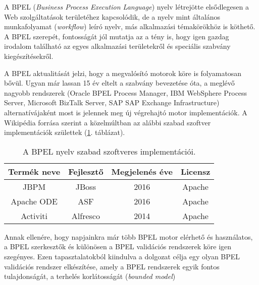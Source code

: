

A BPEL (\textit{Business Process Execution Language}) nyelv létrejötte elsődlegesen a Web szolgáltatások területéhez kapcsolódik, de a nyelv mint általános munkafolyamat (\textit{workflow}) leíró nyelv, más alkalmazási témakörökhöz is köthető. A BPEL szerepét, fontosságát jól mutatja az a tény is, hogy igen gazdag irodalom található az egyes alkalmazási területekről és speciális szabvány kiegészítésekről.

A  BPEL aktualitását jelzi, hogy a megvalósító motorok köre is folyamatosan bővül. Ugyan már lassan 15 év eltelt a szabvány bevezetése óta, a meglévő nagyobb rendszerek (Oracle BPEL Process Manager, IBM WebSphere Process Server, Microsoft BizTalk Server, SAP SAP Exchange Infrastructure) alternatívájaként  most is jelennek meg új végrehajtó motor implementációk. A Wikipédia forrása szerint \cite{wikiBpelList} a közelmúltban az alábbi szabad szoftver implementációk születtek (\ref{tab:bpel_softwares}. táblázat).

\begin{table}[h!]
\centering
\caption{A BPEL nyelv szabad szoftveres implementációi.}
\label{tab:bpel_softwares}
\begin{tabular}{|c|c|c|c|}
\hline
\textbf{Termék neve} & \textbf{Fejlesztő} & \textbf{Megjelenés éve} & \textbf{Licensz}\\
\hline
JBPM & JBoss & 2016 & Apache\\
Apache ODE & ASF & 2016 & Apache\\
Activiti & Alfresco & 2014 & Apache\\
\hline
\end{tabular}
\end{table}

Annak ellenére, hogy napjainkra már több BPEL motor elérhető és használatos, a BPEL szerkesztők és különösen a BPEL validációs rendszerek köre igen szegényes. Ezen tapasztalatokból kiindulva a dolgozat célja egy olyan BPEL validációs rendszer elkészítése, amely a BPEL rendszerek egyik fontos tulajdonságát, a terhelés korlátosságát (\textit{bounded model})

